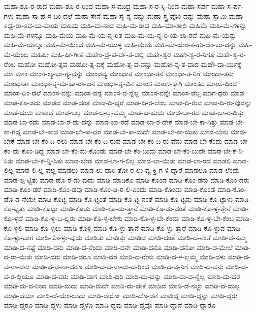 {ಮಹಾ-ಶೂ-ರ-ರಾದ
ಮಹಾ-ಶೂ-ರ-ರಿಂದ
ಮಹಾ-ಸ-ಮುದ್ರ
ಮಹಾ-ಸ-ರ-ಸ್ಸಿ-ನಿಂದ
ಮಹಾ-ಸರ್ಪ
ಮಹಾ-ಸ-ರ್ಪ-ಗಳು
ಮಹಾ-ಸಾ-ಹ-ಸ-ದಿಂ-ದಲೆ
ಮಹಾ-ಸೇನೆ
ಮಹಾ-ಸೈ-ನ್ಯ-ವನ್ನು
ಮಹಾ-ಸ್ತ್ರ-ವೊಂ-ದನ್ನು
ಮಹಾ-ಸ್ವಾಮಿ
ಮಹಾ-ಽಧ್ವ-ರಾ-ಽವ-ಯ-ವಾಯ
ಮಹಿಮ
ಮಹಿ-ಮ-ನಾದ
ಮಹಿ-ಮ-ರಾದ
ಮಹಿ-ಮಾ-ಶಾಲಿ
ಮಹಿಮೆ
ಮಹಿ-ಮೆ-ಗಳನ್ನು
ಮಹಿ-ಮೆ-ಗಳನ್ನೂ
ಮಹಿ-ಮೆಯ
ಮಹಿ-ಮೆ-ಯ-ನ್ನ-ರಿತ
ಮಹಿ-ಮೆ-ಯ-ನ್ನ-ರಿ-ಯ-ಲಾ-ರದೆ
ಮಹಿ-ಮೆ-ಯನ್ನು
ಮಹಿ-ಮೆ-ಯನ್ನೂ
ಮಹಿ-ಮೆ-ಯಿಂದ
ಮಹಿ-ಮೆ-ಯುಳ್ಳ
ಮಹಿ-ಮೆಯೆ
ಮಹಿ-ಮೆ-ಯೆಂ-ತ-ಹು-ದೆಂ-ಬು-ದನ್ನು
ಮಹಿ-ಮೆ-ಯೆಂಬ
ಮಹಿಷೀ
ಮಹಿ-ಷೀ-ಗೀತೆ
ಮಹೇಂ-ದ್ರ-ಪ-ರ್ವ-ತ-ದಲ್ಲಿ
ಮಹೇ-ಶ್ವರ
ಮಹೇ-ಶ್ವ-ರ-ನಿಗೂ
ಮಹೇ-ಶ್ವ-ರ-ರೆಂಬ
ಮಹೋ
ಮಹೋ-ತ್ಸವ
ಮಹೋ-ತ್ಸ-ವಕ್ಕೆ
ಮಹೋ-ತ್ಸ-ವ-ವನ್ನು
ಮಹೋ-ನ್ನ-ತ-ವಾದ
ಮಹೌ-ದಾ-ರ್ಯಕ್ಕೆ
ಮಾ
ಮಾಂ
ಮಾಂಗ-ಲ್ಯ-ಭಾ-ಗ್ಯ-ವನ್ನು
ಮಾಂಡವ್ಯ
ಮಾಂಧಾತ
ಮಾಂಧಾ-ತನ
ಮಾಂಧಾ-ತ-ನಿಗೆ
ಮಾಂಧಾ-ತನು
ಮಾಂಧಾತಾ
ಮಾಂಧಾ-ತೃ-ಮ-ಹಾ-ರಾ-ಜನ
ಮಾಂಧಾ-ತೃ-ವಿನ
ಮಾಂಸ
ಮಾಂಸ-ಕ್ಕಾಗಿ
ಮಾಂಸದ
ಮಾಂಸ-ದಿಂದ
ಮಾಂಸ-ದಿಂ-ದಲೆ
ಮಾಂಸ-ವನ್ನು
ಮಾಂಸ-ವನ್ನೆ
ಮಾಂಸ-ವ-ನ್ನೆಲ್ಲ
ಮಾಂಸ-ವನ್ನೇ
ಮಾಂಸ-ವೆಲ್ಲ
ಮಾಗ-ಧರು
ಮಾಡ
ಮಾಡ-ಕೂ-ಡದು
ಮಾಡದ
ಮಾಡ-ದಂತೆ
ಮಾಡ-ದಿ-ದ್ದರೆ
ಮಾಡ-ದಿ-ರ-ಲೆಂಬ
ಮಾಡ-ದಿ-ರುವ
ಮಾಡ-ದಿ-ರು-ವುದನ್ನು
ಮಾಡ-ದುದು
ಮಾಡದೆ
ಮಾಡ-ಬಲ್ಲ
ಮಾಡ-ಬ-ಲ್ಲ-ವಮ್ಮ
ಮಾಡ-ಬ-ಹುದು
ಮಾಡ-ಬಾ-ರದ
ಮಾಡ-ಬಾ-ರ-ದಿತ್ತು
ಮಾಡ-ಬಾ-ರದು
ಮಾಡ-ಬಾ-ರ-ದು-ದನ್ನು
ಮಾಡ-ಬಾ-ರದೆ
ಮಾಡ-ಬಾ-ರ-ದೇಕೆ
ಮಾಡ-ಬೇ-ಕಾ-ಗಿತ್ತು
ಮಾಡ-ಬೇ-ಕಾ-ಗಿದ್ದ
ಮಾಡ-ಬೇ-ಕಾದ
ಮಾಡ-ಬೇ-ಕಾ-ದರೆ
ಮಾಡ-ಬೇ-ಕಾ-ದುದೇ
ಮಾಡ-ಬೇ-ಕಾ-ಯಿತು
ಮಾಡ-ಬೇಕು
ಮಾಡ-ಬೇಕೆ
ಮಾಡ-ಬೇ-ಕೆಂ-ದಿ-ರಲು
ಮಾಡ-ಬೇ-ಕೆಂ-ದಿ-ರುವ
ಮಾಡ-ಬೇ-ಕೆಂ-ದಿ-ರು-ವೆನು
ಮಾಡ-ಬೇ-ಕೆಂದು
ಮಾಡ-ಬೇ-ಕೆಂ-ದು-ಕೊಂ-ಡಿದ್ದ
ಮಾಡ-ಬೇ-ಕೆಂ-ದು-ಕೊಂಡು
ಮಾಡ-ಬೇ-ಕೆಂ-ಬುದು
ಮಾಡ-ಬೇ-ಕೆಂ-ಬುದೇ
ಮಾಡ-ಬೇ-ಕೆ-ನಿ-ಸಿತು
ಮಾಡ-ಬೇ-ಕೆ-ನ್ನಿ-ಸಿತು
ಮಾಡ-ಬೇಡ
ಮಾಡ-ಲಾ-ಗ-ಲಿಲ್ಲ
ಮಾಡ-ಲಾ-ಯಿತು
ಮಾಡ-ಲಾ-ರದ
ಮಾಡಲಿ
ಮಾಡ-ಲಿಲ್ಲ
ಮಾಡ-ಲಿ-ಲ್ಲ-ವಲ್ಲ
ಮಾಡಲು
ಮಾಡ-ಲು-ದಾರಿ-ತೋ-ರ-ಲು-ವ್ಯ-ಕ್ತಿ-ಗ-ಳಿ-ದ್ದಾರೆ
ಮಾಡಲೂ
ಮಾಡ-ಲೆಂದು
ಮಾಡ-ಲ್ಪ-ಟ್ಟಿತು
ಮಾಡ-ಹೊ-ರ-ಡು-ವುದು
ಮಾಡಿ
ಮಾಡಿಕೊ
ಮಾಡಿ-ಕೊಂಡ
ಮಾಡಿ-ಕೊಂ-ಡನು
ಮಾಡಿ-ಕೊಂ-ಡರು
ಮಾಡಿ-ಕೊಂ-ಡರೆ
ಮಾಡಿ-ಕೊಂ-ಡವು
ಮಾಡಿ-ಕೊಂ-ಡಿ-ರ-ಲಿ-ಎಂದು
ಮಾಡಿ-ಕೊಂಡು
ಮಾಡಿ-ಕೊಂಡೆ
ಮಾಡಿ-ಕೊಂ-ಡೊ-ಡ-ನೆಯೇ
ಮಾಡಿ-ಕೊಟ್ಟ
ಮಾಡಿ-ಕೊ-ಟ್ಟಂತೆ
ಮಾಡಿ-ಕೊ-ಟ್ಟ-ನಂತೆ
ಮಾಡಿ-ಕೊ-ಟ್ಟನು
ಮಾಡಿ-ಕೊ-ಟ್ಟಾಳು
ಮಾಡಿ-ಕೊ-ಟ್ಟಿತು
ಮಾಡಿ-ಕೊಟ್ಟು
ಮಾಡಿ-ಕೊಡು
ಮಾಡಿ-ಕೊ-ಡು-ತ್ತಾನೆ
ಮಾಡಿ-ಕೊ-ಡು-ವಂತೆ
ಮಾಡಿ-ಕೊ-ಳ್ಳ-ತ್ತೇನೆ
ಮಾಡಿ-ಕೊ-ಳ್ಳದೆ
ಮಾಡಿ-ಕೊ-ಳ್ಳ-ಬ-ಲ್ಲರು
ಮಾಡಿ-ಕೊ-ಳ್ಳ-ಬೇಕು
ಮಾಡಿ-ಕೊ-ಳ್ಳ-ಬೇ-ಕೆಂದು
ಮಾಡಿ-ಕೊ-ಳ್ಳ-ಬೇ-ಕೆಂಬ
ಮಾಡಿ-ಕೊ-ಳ್ಳಲಿ
ಮಾಡಿ-ಕೊ-ಳ್ಳಲು
ಮಾಡಿ-ಕೊಳ್ಳಿ
ಮಾಡಿ-ಕೊ-ಳ್ಳು-ತ್ತಾನೆ
ಮಾಡಿ-ಕೊ-ಳ್ಳು-ತ್ತಾರೆ
ಮಾಡಿ-ಕೊ-ಳ್ಳುವ
ಮಾಡಿ-ಕೊ-ಳ್ಳು-ವಾಗ
ಮಾಡಿ-ಕೊ-ಳ್ಳು-ವುದು
ಮಾಡಿತು
ಮಾಡಿತ್ತು
ಮಾಡಿದ
ಮಾಡಿ-ದಂತೆ
ಮಾಡಿ-ದ-ನಂತೆ
ಮಾಡಿ-ದ-ನಮ್ಮ
ಮಾಡಿ-ದ-ನಷ್ಟೆ
ಮಾಡಿ-ದನು
ಮಾಡಿ-ದ-ನೆಂದು
ಮಾಡಿ-ದನೇ
ಮಾಡಿ-ದನೊ
ಮಾಡಿ-ದನೋ
ಮಾಡಿ-ದ-ಮೇಲೆ
ಮಾಡಿ-ದ-ರಾ-ಯಿತು
ಮಾಡಿ-ದರು
ಮಾಡಿ-ದರೂ
ಮಾಡಿ-ದರೆ
ಮಾಡಿ-ದ-ರೇನು
ಮಾಡಿ-ದ-ಳ-ಲ್ಲಮ್ಮ
ಮಾಡಿ-ದಳು
ಮಾಡಿ-ದ-ವ-ನಾ-ದನು
ಮಾಡಿ-ದ-ವ-ನಾ-ದರೂ
ಮಾಡಿ-ದ-ವ-ನಾ-ದು-ದ-ರಿಂದ
ಮಾಡಿ-ದ-ವ-ನಿಗೆ
ಮಾಡಿ-ದ-ವನು
ಮಾಡಿ-ದ-ವ-ರ-ಲ್ಲಿಯೂ
ಮಾಡಿ-ದ-ವರು
ಮಾಡಿ-ದಾಗ
ಮಾಡಿ-ದಿರಿ
ಮಾಡಿ-ದು-ದನ್ನು
ಮಾಡಿ-ದು-ದ-ನ್ನೆಲ್ಲ
ಮಾಡಿ-ದು-ದರ
ಮಾಡಿ-ದು-ದ-ರಿಂದ
ಮಾಡಿ-ದುದು
ಮಾಡಿ-ದುದೇ
ಮಾಡಿ-ದು-ದೇಕೆ
ಮಾಡಿದೆ
ಮಾಡಿ-ದೆ-ನಲ್ಲಾ
ಮಾಡಿ-ದೆ-ಯಲ್ಲ
ಮಾಡಿ-ದೆಯಾ
ಮಾಡಿ-ದೆ-ಯೆಂ-ಬುದು
ಮಾಡಿ-ದೆಯೋ
ಮಾಡಿ-ದೊ-ಡನೆ
ಮಾಡಿದ್ದ
ಮಾಡಿ-ದ್ದನ್ನು
ಮಾಡಿ-ದ್ದರು
ಮಾಡಿ-ದ್ದರೂ
ಮಾಡಿ-ದ್ದಳು
ಮಾಡಿ-ದ್ದಳೊ
ಮಾಡಿ-ದ್ದವು
ಮಾಡಿ-ದ್ದವೊ
ಮಾಡಿ-ದ್ದಾನೆ
ಮಾಡಿ-ದ್ದಾರೊ
}
